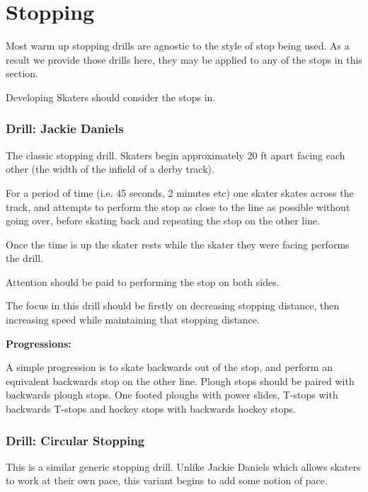 \chapter{Stopping}
\label{ch:stopping}


Most warm up stopping drills are agnostic to the style of stop being used. 
As a result we provide those drills here, they may be applied to any of the stops in this section.  


Developing Skaters should consider the stops in. 
 

\subsection*{Drill: Jackie Daniels} 
\label{drill:stopping/jackie_daniels}


The classic stopping drill.
Skaters begin approximately 20 ft apart facing each other (the width of the infield of a derby track).

For a period of time (i.e. 45 seconds, 2 minutes etc) one skater skates across the track, and attempts to perform the stop as close to the line as possible without going over, before skating back and repeating the stop on the other line.   

Once the time is up the skater rests while the skater they were facing performs the drill. 

Attention should be paid to performing the stop on both sides.  


The focus in this drill should be firstly on decreasing stopping distance, then increasing speed while maintaining that stopping distance.

{\bf Progressions:}

A simple progression is to skate backwards out of the stop, and perform an equivalent backwards stop on the other line.
Plough stops should be paired with backwards plough stops. One footed ploughs with power slides, T-stops with backwards T-stops and hockey stops with backwards hockey stops.


\subsection*{Drill: Circular Stopping}
\label{drill:stopping/circular}

This is a similar generic stopping drill.  
Unlike Jackie Daniels which allows skaters to work at their own pace, this variant begins to add some notion of pace.


